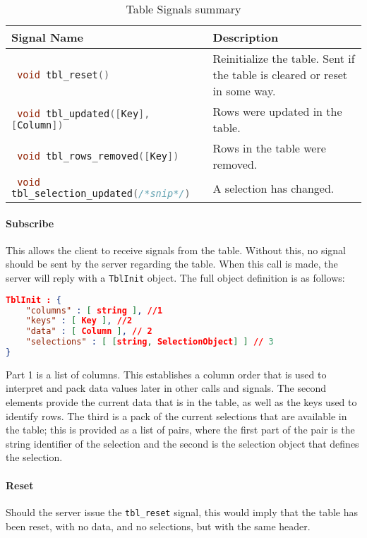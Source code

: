 \documentclass[11pt, oneside]{amsart}
\begin{document}
\begin{table}
	\begin{tabularx}{.9\textwidth}{p{2.5in}X}
		\toprule
		Signal Name & Description \\
		\midrule
		\lstinline[language=c++]| void tbl_reset() |
		&
		Reinitialize the table. Sent if the table is cleared or reset in some way.
		\\
		\lstinline[language=c++]| void tbl_updated([Key], [Column]) |
		&
		Rows were updated in the table.
		\\
		\lstinline[language=c++]| void tbl_rows_removed([Key]) |
		&
		Rows in the table were removed.
		\\
		\lstinline[language=c++]| void tbl_selection_updated(/*snip*/) |
		&
		A selection has changed.
		\\
		\bottomrule
	\end{tabularx}
	\caption{Table Signals summary}
	\label{tbl:table_signals}
\end{table}

\paragraph{\textbf{Subscribe}} This allows the client to receive signals from the table. Without this, no signal should be sent by the server regarding the table. When this call is made, the server will reply with a \texttt{TblInit} object. The full object definition is as follows:

\begin{lstlisting}[language=json]
TblInit : {
	"columns" : [ string ], //1
    "keys" : [ Key ], //2
	"data" : [ Column ], // 2
	"selections" : [ [string, SelectionObject] ] // 3
}
\end{lstlisting}

Part 1 is a list of columns. This establishes a column order that is used to interpret and pack data values later in other calls and signals. The second elements provide the current data that is in the table, as well as the keys used to identify rows. The third is a pack of the current selections that are available in the table; this is provided as a list of pairs, where the first part of the pair is the string identifier of the selection and the second is the selection object that defines the selection.

\paragraph{\textbf{Reset}} Should the server issue the \texttt{tbl\_reset} signal, this would imply that the table has been reset, with no data, and no selections, but with the same header.
\end{document}

